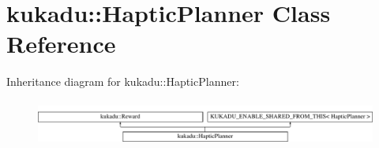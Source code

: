 \hypertarget{classkukadu_1_1HapticPlanner}{\section{kukadu\-:\-:Haptic\-Planner Class Reference}
\label{classkukadu_1_1HapticPlanner}
}
Inheritance diagram for kukadu\-:\-:Haptic\-Planner\-:\begin{figure}[H]
\begin{center}
\leavevmode
\includegraphics[height=1.530055cm]{classkukadu_1_1HapticPlanner}
\end{center}
\end{figure}
